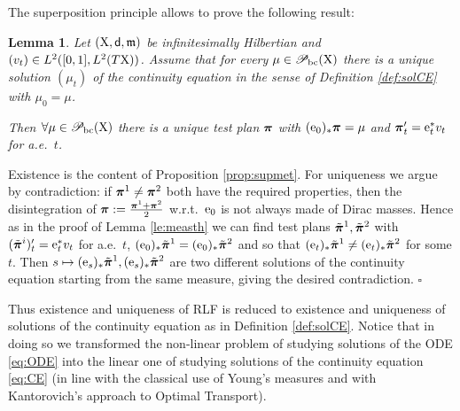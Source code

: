 \documentclass[11pt]{article}
\numberwithin{equation}{section}
\newtheorem{lemma}[theorem]{Lemma}
\newenvironment{idea}{\removelastskip\par\medskip   %
\noindent{\em Idea of the proof} \rm}{\penalty-20\null\hfill$\square$\par\medbreak}
\newcommand{\ppi}{{\mbox{\boldmath$\pi$}}}
\newcommand{\sppi}{{\mbox{\scriptsize\boldmath$\pi$}}}
\newcommand{\pr}{\mathscr P}
\newcommand{\e}{{\rm e}}
\newcommand{\X}{{\rm X}}
\newcommand{\sfd}{{\sf d}}
\newcommand{\mm}{{\mathfrak m}}
\newcommand{\bc}{{\rm bc}}
\begin{document}
The superposition principle allows to prove the following result:
\begin{lemma}\label{le:ponte}
Let $(\X,\sfd,\mm)$ be infinitesimally Hilbertian and $(v_t)\in L^2([0,1],L^2(T\X))$. Assume that for every $\mu\in\pr_\bc(\X)$ there is a unique solution $(\mu_t)$ of the continuity equation in the sense of Definition \ref{def:solCE} with $\mu_0=\mu$. 

Then  $\forall\mu\in\pr_\bc(\X)$ there is a unique test plan $\ppi$ with $(\e_0)_*\ppi=\mu$ and $\ppi'_t=\e_t^*v_t$ for a.e.\ $t$.
\end{lemma}
\begin{idea}
Existence is the content of Proposition \ref{prop:supmet}. For uniqueness we argue by contradiction: if $\ppi^1\neq \ppi^2$ both have the required properties, then the disintegration of $\ppi:=\frac{\sppi^1+\sppi^2}2$ w.r.t.\ $\e_0$ is not always made of Dirac masses. Hence as in the proof of Lemma \ref{le:measth} we can find test plans $\tilde\ppi^1,\tilde\ppi^2$ with  $(\tilde\ppi^i)'_t=\e_t^*v_t$ for a.e.\ $t$, $(\e_0)_*\tilde\ppi^1=(\e_0)_*\tilde\ppi^2$ and so that $(\e_t)_*\tilde\ppi^1\neq(\e_t)_*\tilde\ppi^2$ for some $t$. Then $s\mapsto (\e_s)_*\tilde\ppi^1,(\e_s)_*\tilde\ppi^2$ are two different solutions of the continuity equation starting from the same measure, giving the desired contradiction.
\end{idea}
Thus existence and uniqueness of RLF is reduced to existence and uniqueness of solutions of the continuity equation as in Definition \ref{def:solCE}. Notice that in doing so we transformed the non-linear problem of studying solutions of the ODE \eqref{eq:ODE} into the linear one of studying solutions of the continuity equation \eqref{eq:CE} (in line with the classical use of Young's measures and with Kantorovich's approach to Optimal Transport).
\end{document}
